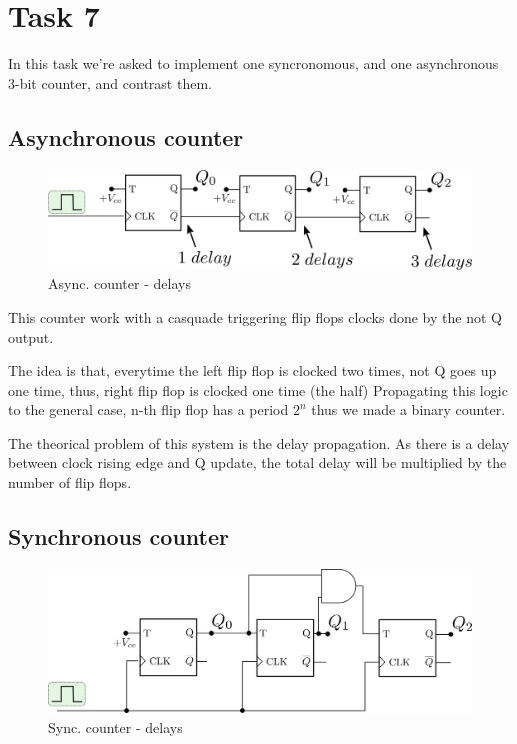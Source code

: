 \newpage

\section*{Task 7}

In this task we're asked to implement one syncronomous, and one asynchronous 3-bit counter, and contrast them.

\subsection*{Asynchronous counter}
\begin{figure}[H]
    \begin{centering}
    \includegraphics[width=1\textwidth]{data/async.png}
    \par\end{centering}
    \caption{Async. counter - delays}
\end{figure}


This counter work with a casquade triggering flip flops clocks done by the not Q output.

The idea is that, everytime the left flip flop is clocked two times, not Q goes up one time, thus, right flip flop is clocked one time (the half)
Propagating this logic to the general case, n-th flip flop has a period $2^n$ thus we made a binary counter. 

The theorical problem of this system is the delay propagation. As there is a delay between clock rising edge and Q update, the total delay will be multiplied by the number of flip flops.

\subsection*{Synchronous counter}
\begin{figure}[H]
    \begin{centering}
    \includegraphics[width=1\textwidth]{data/sync.png}
    \par\end{centering}
    \caption{Sync. counter - delays}
\end{figure}


